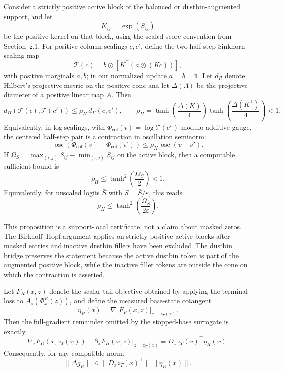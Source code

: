 \begin{proposition}\label{prop:projective_contraction}
Consider a strictly positive active block of the balanced or dustbin-augmented support, and let
\[
K_{ij}=\exp(S_{ij})
\]
be the positive kernel on that block, using the scaled score convention from Section~2.1. For positive column scalings $c,c'$, define the two-half-step Sinkhorn scaling map
\[
\mathcal{T}(c)
=
b\oslash
\left[
K^\top
\left(a\oslash(Kc)\right)
\right],
\]
with positive marginals $a,b$; in our normalized update $a=b=\mathbf{1}$. Let $d_H$ denote Hilbert's projective metric on the positive cone and let $\Delta(A)$ be the projective diameter of a positive linear map $A$. Then
\[
d_H(\mathcal{T}(c),\mathcal{T}(c'))
\le
\rho_H\,d_H(c,c'),
\qquad
\rho_H
=
\tanh\!\left(\frac{\Delta(K)}{4}\right)
\tanh\!\left(\frac{\Delta(K^\top)}{4}\right)
<1.
\]
Equivalently, in log scalings, with $\Phi_{\mathrm{col}}(v)=\log \mathcal{T}(e^v)$ modulo additive gauge, the centered half-step pair is a contraction in oscillation seminorm:
\[
\operatorname{osc}\!\left(\Phi_{\mathrm{col}}(v)-\Phi_{\mathrm{col}}(v')\right)
\le
\rho_H\,\operatorname{osc}(v-v').
\]
If $\Omega_S=\max_{(i,j)}S_{ij}-\min_{(i,j)}S_{ij}$ on the active block, then a computable sufficient bound is
\[
\rho_H\le \tanh^2\!\left(\frac{\Omega_S}{2}\right)<1.
\]
Equivalently, for unscaled logits $\bar S$ with $S=\bar S/\varepsilon$, this reads
\[
\rho_H\le \tanh^2\!\left(\frac{\Omega_{\bar S}}{2\varepsilon}\right).
\]
\end{proposition}

This proposition is a support-local certificate, not a claim about masked zeros. The Birkhoff--Hopf argument \citep{birkhoff1957extensions,bushell1973hilbert} applies on strictly positive active blocks after masked entries and inactive dustbin fillers have been excluded. The dustbin bridge preserves the statement because the active dustbin token is part of the augmented positive block, while the inactive filler tokens are outside the cone on which the contraction is asserted.

\begin{proposition}\label{prop:bias_certificate}
Let $F_R(x,z)$ denote the scalar tail objective obtained by applying the terminal loss to $A_x(\Phi_x^R(z))$, and define the measured base-state cotangent
\[
\eta_R(x)=\nabla_z F_R(x,z)\big|_{z=z_T(x)}.
\]
Then the full-gradient remainder omitted by the stopped-base surrogate is exactly
\[
\nabla_x F_R(x,z_T(x))
-
\partial_xF_R(x,z)\big|_{z=z_T(x)}
=
D_xz_T(x)^\top \eta_R(x).
\]
Consequently, for any compatible norm,
\[
\|\Delta g_R\|\le \|D_xz_T(x)^\top\|\,\|\eta_R(x)\|.
\]
\end{proposition}

